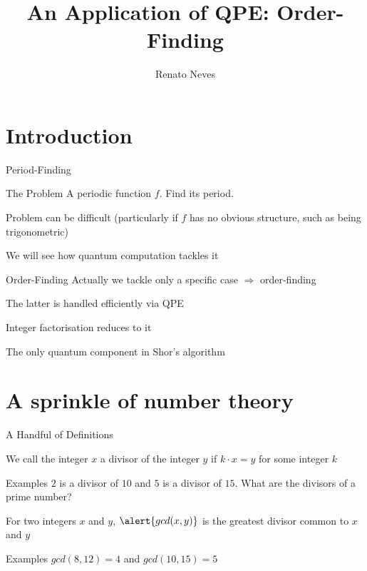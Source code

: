 \documentclass{beamer}
\author[Renato Neves]{Renato Neves}
\date{}
\begin{document}
\title{An Application of QPE: Order-Finding}

\frame[plain]{\titlepage}

\section{Introduction}

\begin{frame}{Period-Finding}

        \begin{block}{The Problem}
                A \alert{periodic} function $f$. Find its period.
        \end{block}

        \pause
        Problem can be difficult (particularly if $f$ has no obvious
        structure, such as being trigonometric)

        We will see how quantum computation tackles it
\end{frame}

\begin{frame}{Order-Finding}
        Actually we tackle only a specific
        case $\Rightarrow$  \alert{order-finding}

        The latter is handled efficiently via QPE 

        \alert{Integer factorisation} reduces to it

        The only quantum component in Shor's algorithm
\end{frame}

\section{A sprinkle of number theory}

\begin{frame}{A Handful of Definitions}

        \begin{definition}
                We call the integer $x$ a \alert{divisor} of the 
                integer $y$ if $k \cdot x = y$ for some integer $k$
        \end{definition}

        \begin{block}{Examples}
                $2$ is a divisor of $10$ and $5$ is a divisor of $15$. What are
                the divisors of a prime number?
        \end{block}

        \begin{definition}
                For two integers $x$ and $y$, $\alert{gcd(x,y)}$ is the
                greatest divisor common to $x$ and $y$
        \end{definition}

        \begin{block}{Examples}
                $gcd(8,12) = 4$ and $gcd(10,15) = 5$
        \end{block}
\end{frame}
\end{document}
